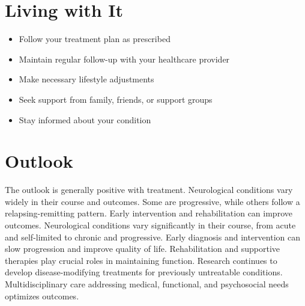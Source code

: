 \section{Living with It}
\begin{itemize}[noitemsep]
  \item Follow your treatment plan as prescribed
  \item Maintain regular follow-up with your healthcare provider
  \item Make necessary lifestyle adjustments
  \item Seek support from family, friends, or support groups
  \item Stay informed about your condition
\end{itemize}
\section{Outlook}
The outlook is generally positive with treatment. Neurological conditions vary widely in their course and outcomes. Some are progressive, while others follow a relapsing-remitting pattern. Early intervention and rehabilitation can improve outcomes. Neurological conditions vary significantly in their course, from acute and self-limited to chronic and progressive. Early diagnosis and intervention can slow progression and improve quality of life. Rehabilitation and supportive therapies play crucial roles in maintaining function. Research continues to develop disease-modifying treatments for previously untreatable conditions. Multidisciplinary care addressing medical, functional, and psychosocial needs optimizes outcomes.
